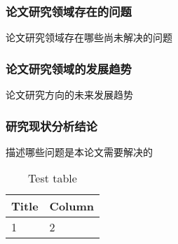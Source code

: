 \subsubsection{论文研究领域存在的问题}
论文研究领域存在哪些尚未解决的问题
\subsubsection{论文研究领域的发展趋势}
论文研究方向的未来发展趋势
\subsubsection{研究现状分析结论}
描述哪些问题是本论文需要解决的

\begin{table}[ht]
  \caption{Test table}
  \renewcommand{\arraystretch}{0.8}
  \centering
  \begin{tabular}{l l}
    \midrule
    Title & Column \\
    \midrule
    1 & 2\\
    \midrule
  \end{tabular}
\end{table}

\clearpage
